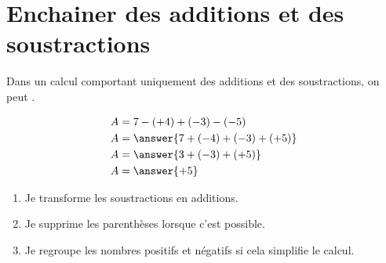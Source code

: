 \section{Enchainer des additions et des soustractions}
\begin{rappelbox}
    Dans un calcul comportant uniquement des additions et des soustractions,
    on peut .
\end{rappelbox}

\begin{exemplebox}
    \begin{align*}
        & A = 7-(+4)+(-3)-(-5) \\
        & A =\answer{7+(-4)+(-3) + (+5) } \\
        & A =\answer{3+(-3)+(+5)} \\
        & A =\answer{+5}
    \end{align*}
\end{exemplebox}

\begin{methodebox}
\begin{enumerate}
    \item Je transforme les soustractions en additions.
    \item Je supprime les parenthèses lorsque c'est possible.
    \item Je regroupe les nombres positifs et négatifs si cela simplifie
    le calcul.
\end{enumerate}
\end{methodebox}

% 
% 
% 
% 
